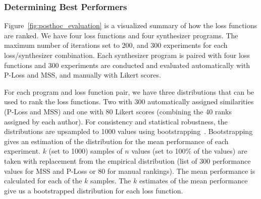 \documentclass[lettersize,journal]{IEEEtran}
\newcommand{\BPNoise}{\textbf{BP-Noise}}
\newcommand{\AddSineSaw}{\textbf{Add-SineSaw}}
\newcommand{\AmpMod}{\textbf{Noise-AM}}
\newcommand{\FMMod}{\textbf{SineSaw-AM}}
\begin{document}


\subsubsection{Determining Best Performers}
 Figure~\ref{fig:posthoc_evaluation} is a visualized summary of how the loss functions are ranked. We have four loss functions and four synthesizer programs. The maximum number of iterations set to 200, and 300 experiments for each loss/synthesizer combination. Each synthesizer program is paired with four loss functions and 300 experiments are conducted and evaluated automatically with P-Loss and MSS, and manually with Likert scores.

For each program and loss function pair, we have three distributions that can be used to rank the loss functions. Two with 300 automatically assigned similarities (P-Loss and MSS) and one with 80 Likert scores (combining the 40 ranks assigned by each author). For consistency and statistical robustness, the distributions are upsampled to 1000 values using bootstrapping~\cite{tibshirani1993introduction}. Bootstrapping gives an estimation of the distribution for the mean performance of each experiment. $k$ (set to 1000) samples of $n$ values (set to 100\% of the values) are taken with replacement from the empirical distribution (list of 300 performance values for MSS and P-Loss or 80 for manual rankings). The mean performance is calculated for each of the $k$ samples. The $k$ estimates of the mean performance give us a bootstrapped distribution for each loss function. 
\end{document}
